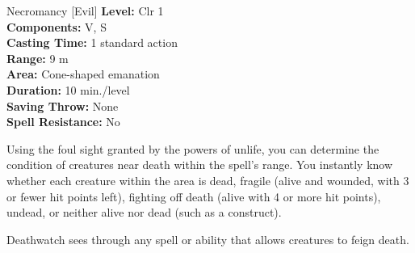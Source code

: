 {Necromancy [Evil]}
{
	\textbf{Level:}
	Clr 1\\
	\textbf{Components:}
	V, S\\
	\textbf{Casting Time:}
	1 standard action\\
	\textbf{Range:}
	9 m\\
	\textbf{Area:}
	Cone-shaped emanation\\
	\textbf{Duration:}
	10 min./level\\
	\textbf{Saving Throw:}
	None\\
	\textbf{Spell Resistance:}
	No\\
}
{
	Using the foul sight granted by the powers of unlife, you can determine the condition of creatures near death within the spell's range. You instantly know whether each creature within the area is dead, fragile (alive and wounded, with 3 or fewer hit points left), fighting off death (alive with 4 or more hit points), undead, or neither alive nor dead (such as a construct).

Deathwatch sees through any spell or ability that allows creatures to feign death.

}

